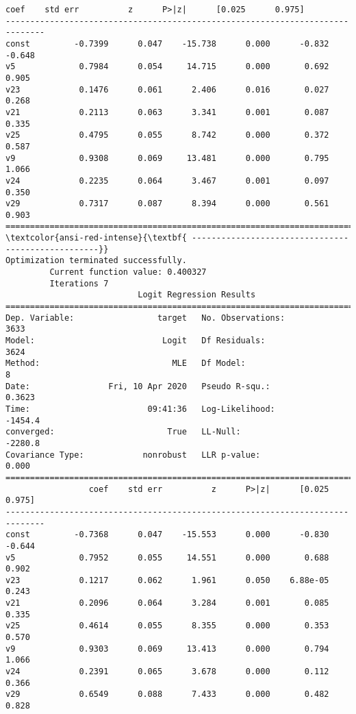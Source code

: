 \documentclass[11pt]{article}
\begin{document}
\begin{Verbatim}[commandchars=\\\{\}]
                 coef    std err          z      P>|z|      [0.025      0.975]
------------------------------------------------------------------------------
const         -0.7399      0.047    -15.738      0.000      -0.832      -0.648
v5             0.7984      0.054     14.715      0.000       0.692       0.905
v23            0.1476      0.061      2.406      0.016       0.027       0.268
v21            0.2113      0.063      3.341      0.001       0.087       0.335
v25            0.4795      0.055      8.742      0.000       0.372       0.587
v9             0.9308      0.069     13.481      0.000       0.795       1.066
v24            0.2235      0.064      3.467      0.001       0.097       0.350
v29            0.7317      0.087      8.394      0.000       0.561       0.903
==============================================================================
\textcolor{ansi-red-intense}{\textbf{ ---------------------------------------------------}}
Optimization terminated successfully.
         Current function value: 0.400327
         Iterations 7
                           Logit Regression Results                           
==============================================================================
Dep. Variable:                 target   No. Observations:                 3633
Model:                          Logit   Df Residuals:                     3624
Method:                           MLE   Df Model:                            8
Date:                Fri, 10 Apr 2020   Pseudo R-squ.:                  0.3623
Time:                        09:41:36   Log-Likelihood:                -1454.4
converged:                       True   LL-Null:                       -2280.8
Covariance Type:            nonrobust   LLR p-value:                     0.000
==============================================================================
                 coef    std err          z      P>|z|      [0.025      0.975]
------------------------------------------------------------------------------
const         -0.7368      0.047    -15.553      0.000      -0.830      -0.644
v5             0.7952      0.055     14.551      0.000       0.688       0.902
v23            0.1217      0.062      1.961      0.050    6.88e-05       0.243
v21            0.2096      0.064      3.284      0.001       0.085       0.335
v25            0.4614      0.055      8.355      0.000       0.353       0.570
v9             0.9303      0.069     13.413      0.000       0.794       1.066
v24            0.2391      0.065      3.678      0.000       0.112       0.366
v29            0.6549      0.088      7.433      0.000       0.482       0.828

\end{Verbatim}
\end{document}
